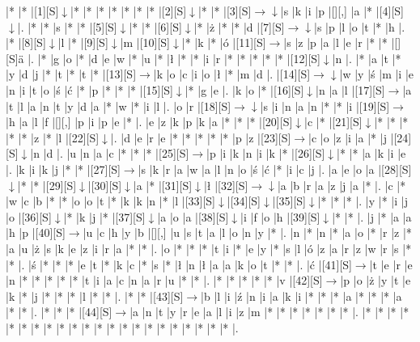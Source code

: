 \documentclass[11pt]{article}
\newcommand\drarr{$\rightarrow \!\!\!\!\! \downarrow$}
\newcommand\rarr{$\rightarrow$}
\newcommand\darr{$\downarrow$}
\begin{document}
\noindent\begin{Puzzle}{21}{23}|*	|*	|[1][S]\darr	|*	|*	|*	|*	|*	|*	|*	|[2][S]\darr	|*	|*	|[3][S]\drarr	|s	|k	|i	|p	|[][,]{ }	|a	|*	|[4][S]\darr	|.
|*	|*	|s	|*	|*	|[5][S]\darr	|*	|*	|[6][S]\darr	|*	|ż	|*	|*	|d	|[7][S]\drarr	|s	|p	|l	|o	|t	|*	|h	|.
|*	|[8][S]\darr	|l	|*	|[9][S]\darr	|m	|[10][S]\darr	|*	|k	|*	|ó	|[11][S]\rarr	|s	|z	|p	|a	|l	|e	|r	|*	|*	|[][S]ä	|.
|*	|g	|o	|*	|d	|e	|w	|*	|u	|*	|ł	|*	|*	|i	|r	|*	|*	|*	|*	|*	|[12][S]\darr	|n	|.
|*	|a	|t	|*	|y	|d	|j	|*	|t	|*	|t	|*	|[13][S]\rarr	|k	|o	|c	|i	|o	|ł	|*	|m	|d	|.
|[14][S]\drarr	|w	|y	|ś	|m	|i	|e	|n	|i	|t	|o	|ś	|ć	|*	|p	|*	|*	|*	|[15][S]\darr	|*	|g	|e	|.
|k	|o	|*	|[16][S]\darr	|n	|a	|l	|[17][S]\rarr	|a	|t	|l	|a	|n	|t	|y	|d	|a	|*	|w	|*	|i	|l	|.
|o	|r	|[18][S]\drarr	|s	|i	|n	|a	|n	|*	|*	|i	|[19][S]\rarr	|h	|a	|l	|f	|[][,]{ }	|p	|i	|p	|e	|*	|.
|e	|z	|k	|p	|k	|a	|*	|*	|*	|[20][S]\darr	|c	|*	|[21][S]\darr	|*	|*	|*	|*	|*	|z	|*	|l	|[22][S]\darr	|.
|d	|e	|r	|e	|*	|*	|*	|*	|*	|p	|z	|[23][S]\rarr	|c	|o	|z	|i	|a	|*	|j	|[24][S]\darr	|n	|d	|.
|u	|n	|a	|c	|*	|*	|*	|[25][S]\rarr	|p	|i	|k	|n	|i	|k	|*	|[26][S]\darr	|*	|*	|a	|k	|i	|e	|.
|k	|i	|k	|j	|*	|*	|[27][S]\rarr	|s	|k	|r	|a	|w	|a	|l	|n	|o	|ś	|ć	|*	|i	|c	|j	|.
|a	|e	|o	|a	|[28][S]\darr	|*	|*	|[29][S]\darr	|[30][S]\darr	|a	|*	|[31][S]\darr	|ł	|[32][S]\drarr	|a	|b	|r	|a	|z	|j	|a	|*	|.
|c	|*	|w	|c	|b	|*	|*	|o	|o	|t	|*	|k	|k	|n	|*	|l	|[33][S]\darr	|[34][S]\darr	|[35][S]\darr	|*	|*	|*	|.
|y	|*	|i	|j	|o	|[36][S]\darr	|*	|k	|j	|*	|[37][S]\darr	|a	|o	|a	|[38][S]\darr	|i	|f	|o	|h	|[39][S]\darr	|*	|*	|.
|j	|*	|a	|a	|h	|p	|[40][S]\rarr	|u	|c	|h	|y	|b	|[][,]{ }	|u	|s	|t	|a	|l	|o	|n	|y	|*	|.
|n	|*	|n	|*	|a	|o	|*	|r	|z	|*	|a	|u	|ż	|s	|k	|e	|z	|i	|r	|a	|*	|*	|.
|o	|*	|*	|*	|t	|i	|*	|e	|y	|*	|s	|l	|ó	|z	|a	|r	|z	|w	|r	|s	|*	|*	|.
|ś	|*	|*	|*	|e	|t	|*	|k	|c	|*	|s	|*	|ł	|n	|ł	|a	|a	|k	|o	|t	|*	|*	|.
|ć	|[41][S]\rarr	|t	|e	|r	|e	|n	|*	|*	|*	|*	|*	|t	|i	|a	|c	|n	|a	|r	|u	|*	|*	|.
|*	|*	|*	|*	|*	|v	|[42][S]\rarr	|p	|o	|ż	|y	|t	|e	|k	|*	|j	|*	|*	|*	|l	|*	|*	|.
|*	|*	|[43][S]\rarr	|b	|l	|i	|ź	|n	|i	|a	|k	|i	|*	|*	|*	|a	|*	|*	|*	|a	|*	|*	|.
|*	|*	|*	|[44][S]\rarr	|a	|n	|t	|y	|r	|e	|a	|l	|i	|z	|m	|*	|*	|*	|*	|*	|*	|*	|.
|*	|*	|*	|*	|*	|*	|*	|*	|*	|*	|*	|*	|*	|*	|*	|*	|*	|*	|*	|*	|*	|*	|.\end{Puzzle}

\newpage
\end{document}
